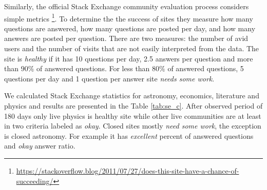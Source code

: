 Similarly, the official Stack Exchange community evaluation process considers simple metrics \footnote{\href{https://stackoverflow.blog/2011/07/27/does-this-site-have-a-chance-of-succeeding/}{https://stackoverflow.blog/2011/07/27/does-this-site-have-a-chance-of-succeeding/}}. To determine the the success of sites  they measure how many questions are answered, how many questions are posted per day, and how many answers are posted per question.  There are two measures: the number of avid users and the number of visits that are not easily interpreted from the data. The site is \textit{healthy} if it has 10 questions per day, 2.5 answers per question and more than $90\%$ of answered questions. For less than $80\%$ of answered questions, 5 questions per day and 1 question per answer site \textit{needs some work}. 

We calculated Stack Exchange statistics for astronomy, economics, literature and physics and results are presented in the Table \ref{tab:se_c}. After observed period of 180 days only live physics is healthy site while other live communities are at least in two criteria labeled as \textit{okay}. Closed sites mostly \textit{need some work}, the exception is closed astronomy. For example it has \textit{excellent} percent of answered questions and \textit{okay} answer ratio.  


